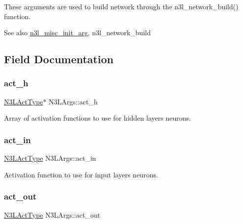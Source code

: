 These arguments are used to build network through the n3l\+\_\+network\+\_\+build() function.

\begin{DoxySeeAlso}{See also}
\hyperlink{n3__misc_8c_a22f4dc2ca9ee867a30c91565e37788d9}{n3l\+\_\+misc\+\_\+init\+\_\+arg}, n3l\+\_\+network\+\_\+build 
\end{DoxySeeAlso}


\subsection{Field Documentation}
\mbox{\label{structN3LArgs_a968aa1ed194fc7bbfaac154bcbf8a405}} 
\subsubsection{\texorpdfstring{act\+\_\+h}{act\_h}}
{\footnotesize\ttfamily \hyperlink{n3__header_8h_a3118e8995213ca26bd388c3d94cd8056}{N3\+L\+Act\+Type}$\ast$ N3\+L\+Args\+::act\+\_\+h}

Array of activation functions to use for hidden layer\textquotesingle{}s neurons. \mbox{\label{structN3LArgs_abb810a671b7a1b20c161e81e309f843c}} 
\subsubsection{\texorpdfstring{act\+\_\+in}{act\_in}}
{\footnotesize\ttfamily \hyperlink{n3__header_8h_a3118e8995213ca26bd388c3d94cd8056}{N3\+L\+Act\+Type} N3\+L\+Args\+::act\+\_\+in}

Activation function to use for input layer\textquotesingle{}s neurons. \mbox{\label{structN3LArgs_ad9d17026b32668acea535143809b16c5}} 
\subsubsection{\texorpdfstring{act\+\_\+out}{act\_out}}
{\footnotesize\ttfamily \hyperlink{n3__header_8h_a3118e8995213ca26bd388c3d94cd8056}{N3\+L\+Act\+Type} N3\+L\+Args\+::act\+\_\+out}

